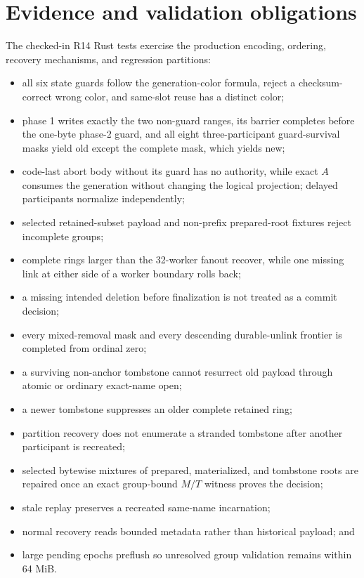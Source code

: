 \documentclass[10pt,twocolumn]{article}
\theoremstyle{remark}
\begin{document}
\section{Evidence and validation obligations}

The checked-in R14 Rust tests exercise the production encoding, ordering, recovery mechanisms, and
regression partitions:
\begin{itemize}
  \item all six state guards follow the generation-color formula, reject a checksum-correct wrong
  color, and same-slot reuse has a distinct color;
  \item phase 1 writes exactly the two non-guard ranges, its barrier completes before the one-byte
  phase-2 guard, and all eight three-participant guard-survival masks yield old except the complete
  mask, which yields new;
  \item code-last abort body without its guard has no authority, while exact $A$ consumes the
  generation without changing the logical projection; delayed participants normalize independently;
  \item selected retained-subset payload and non-prefix prepared-root fixtures reject incomplete
  groups;
  \item complete rings larger than the 32-worker fanout recover, while one missing link at either
  side of a worker boundary rolls back;
  \item a missing intended deletion before finalization is not treated as a commit decision;
  \item every mixed-removal mask and every descending durable-unlink frontier is completed from
  ordinal zero;
  \item a surviving non-anchor tombstone cannot resurrect old payload through atomic or ordinary
  exact-name open;
  \item a newer tombstone suppresses an older complete retained ring;
  \item partition recovery does not enumerate a stranded tombstone after another participant is
  recreated;
  \item selected bytewise mixtures of prepared, materialized, and tombstone roots are repaired
  once an exact group-bound $M/T$ witness proves the decision;
  \item stale replay preserves a recreated same-name incarnation;
  \item normal recovery reads bounded metadata rather than historical payload; and
  \item large pending epochs preflush so unresolved group validation remains within 64 MiB.
\end{itemize}
\end{document}
